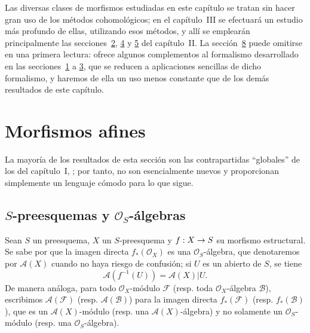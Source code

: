 \documentclass[oneside,10pt]{amsart}
\makeatletter
\newcommand{\ega@arrow}[2]{\mathchoice{#1}{#2}{#2}{#2}}
\renewcommand{\to}{\ega@arrow{\longrightarrow}{\rightarrow}}
\newcommand{\oldpage}[2][]{\marginnote{\normalfont\footnotesize\textbf{#1}~|~#2}\ignorespaces}
\let\EGAOriginalLabel\label
\renewcommand{\label}[1]{\phantomsection\EGAOriginalLabel{#1}}
\makeatother
\begin{document}
Las diversas clases de morfismos estudiadas en este capítulo se tratan sin hacer gran uso de los métodos cohomológicos; en el capítulo~III se efectuará un estudio más profundo de ellas, utilizando esos métodos, y allí se emplearán principalmente las secciones~\textsection\textsection\hyperref[section:II.2-fr]{2}, \hyperref[section:II.4-fr]{4} y \hyperref[section:II.5-fr]{5} del capítulo~II.
La sección~\textsection\hyperref[section:II.8-fr]{8} puede omitirse en una primera lectura: ofrece algunos complementos al formalismo desarrollado en las secciones~\textsection\textsection\hyperref[section:II.1-fr]{1} a \hyperref[section:II.3-fr]{3}, que se reducen a aplicaciones sencillas de dicho formalismo, y haremos de ella un uso menos constante que de los demás resultados de este capítulo.
\bigskip

\section{Morfismos afines}
\label{section:II.1-fr}

La mayoría de los resultados de esta sección son las contrapartidas ``globales'' de los del capítulo~I, ; por tanto, no son esencialmente nuevos y proporcionan simplemente un lenguaje cómodo para lo que sigue.
\bigskip

\subsection{$S$-preesquemas y $\mathcal{O}_S$-álgebras}
\label{subsection:II.1.1-fr}

\begin{env}[1.1.1]
\label{II.1.1.1-fr}
Sean $S$ un preesquema, $X$ un $S$-preesquema y $f:X\to S$ su morfismo estructural.
Se sabe por  que la imagen directa $f_*(\mathcal{O}_X)$ es una $\mathcal{O}_S$-álgebra, que
\oldpage[II]{6}
denotaremos por $\mathcal{A}(X)$ cuando no haya riesgo de confusión; si $U$ es un abierto de $S$, se tiene
\[
  \mathcal{A}(f^{-1}(U))=\mathcal{A}(X)|U.
\]
De manera análoga, para todo $\mathcal{O}_X$-módulo $\mathcal{F}$ (resp. toda $\mathcal{O}_X$-álgebra $\mathcal{B}$), escribimos $\mathcal{A}(\mathcal{F})$ (resp. $\mathcal{A}(\mathcal{B})$) para la imagen directa $f_*(\mathcal{F})$ (resp. $f_*(\mathcal{B})$), que es un $\mathcal{A}(X)$-módulo (resp. una $\mathcal{A}(X)$-álgebra) y no solamente un $\mathcal{O}_S$-módulo (resp. una $\mathcal{O}_S$-álgebra).
\end{env}
\end{document}
